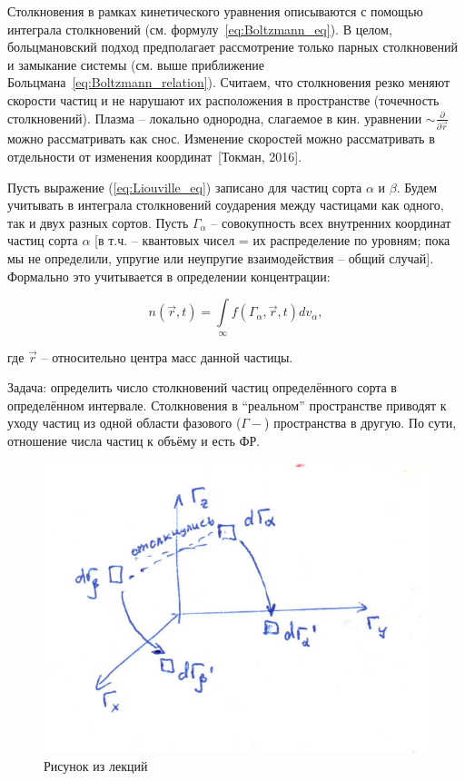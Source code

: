 \documentclass[10pt, a4paper]{article}
\newcommand{\Tokman}{~[Токман, 2016]}
\begin{document}
Столкновения в рамках кинетического уравнения описываются с помощью интеграла столкновений (см. формулу~\eqref{eq:Boltzmann_eq}). В целом, больцмановский подход предполагает рассмотрение только парных столкновений и замыкание системы (см. выше приближение Больцмана~\eqref{eq:Boltzmann_relation}). Считаем, что столкновения резко меняют скорости частиц и не нарушают их расположения в пространстве (точечность столкновений). Плазма -- локально однородна, слагаемое в кин. уравнении $\sim \frac{\partial}{\partial \vec{r}}$ можно рассматривать как снос. Изменение скоростей можно рассматривать в отдельности от изменения координат\Tokman.

Пусть выражение (\eqref{eq:Liouville_eq}) записано для частиц сорта $\alpha$ и $\beta$. Будем учитывать в интеграла столкновений соударения между частицами как одного, так и двух разных сортов. Пусть $\Gamma_\alpha$ -- совокупность всех внутренних координат частиц сорта $\alpha$ [в т.ч. -- квантовых чисел = их распределение по уровням; пока мы не определили, упругие или неупругие взаимодействия -- общий случай]. Формально это учитывается в определении концентрации:

\begin{equation*}
	n(\vec{r}, t) = \int\limits_{\infty}f(\Gamma_\alpha,\vec{r},t)dv_\alpha,
\end{equation*}

где $\vec{r}$ -- относительно центра масс данной частицы.

Задача: определить число столкновений частиц определённого сорта в определённом интервале. Столкновения в ``реальном'' пространстве приводят к уходу частиц из одной области фазового ($\Gamma-$) пространства в другую. По сути, отношение числа частиц к объёму и есть ФР.

\begin{figure}[ht]
	\begin{center}
		\includegraphics[width=0.45\linewidth]{boltzmann_collision_term.pdf}
	\end{center}
	\caption{Рисунок из лекций}
	\label{fig:boltzmann_collision_term}
\end{figure}
\end{document}
